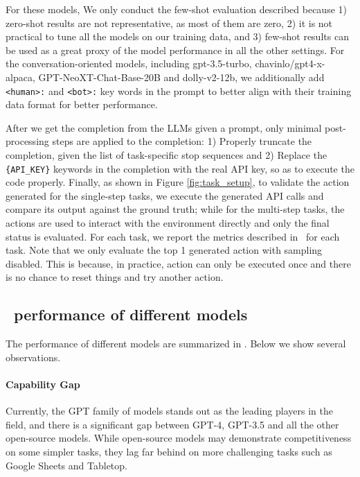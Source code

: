 For these models, We only conduct the few-shot evaluation described  because 1) zero-shot results are not representative, as most of them are zero, 2) it is not practical to tune all the models on our training data, and 3) few-shot results can be used as a great proxy of the model performance in all the other settings.
For the conversation-oriented models, including gpt-3.5-turbo, chavinlo/gpt4-x-alpaca, GPT-NeoXT-Chat-Base-20B and dolly-v2-12b, we additionally add \texttt{<human>:} and \texttt{<bot>:} key words in the prompt to better align with their training data format for better performance.


After we get the completion from the LLMs given a prompt, only minimal post-processing steps are applied to the completion: 
1) Properly truncate the completion, given the list of task-specific stop sequences and 
2) Replace the \texttt{\{API\_KEY\}} keywords in the completion with the real API key, so as to execute the code properly. Finally, as shown in Figure \ref{fig:task_setup}, to validate the action generated for the single-step tasks, we execute the generated API calls and compare its output against the ground truth; while for the multi-step tasks, the actions are used to interact with the environment directly and only the final status is evaluated. For each task, we report the metrics described in~ for each task. Note that we only evaluate the top 1 generated action with sampling disabled. This is because, in practice, action can only be executed once and there is no chance to reset things and try another action. 








\subsection{\snact~performance of different models}
The performance of different models are summarized in . Below we show several observations.

\paragraph{Capability Gap} Currently, the GPT family of models stands out as the leading players in the field, and there is a significant gap between GPT-4, GPT-3.5 and all the other open-source models. While open-source models may demonstrate competitiveness on some simpler tasks, they lag far behind on more challenging tasks such as Google Sheets and Tabletop.

